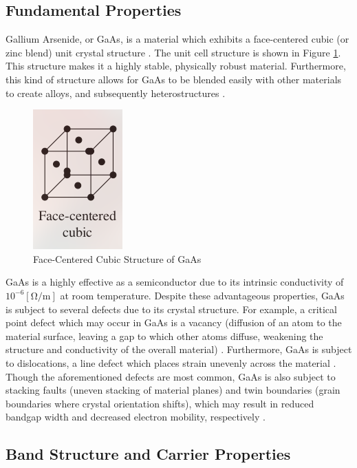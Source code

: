 \documentclass[conference]{IEEEtran}
\begin{document}
\subsection{Fundamental Properties}

Gallium Arsenide, or GaAs, is a material which exhibits a face-centered cubic (or zinc blend) unit crystal structure \cite[Page 104]{textbook}. The unit cell structure is shown in Figure \ref{fig:3}. This structure makes it a highly stable, physically robust material. Furthermore, this kind of structure allows for GaAs to be blended easily with other materials to create alloys, and subsequently heterostructures \cite[Page 568]{textbook}.

\begin{figure}[h]
  \centering
  \includegraphics[width=.2\textwidth]{Figures/FCC}
  \caption{Face-Centered Cubic Structure of GaAs \cite[Page 104]{textbook}}
  \label{fig:3}
\end{figure}

GaAs is a highly effective as a semiconductor due to its intrinsic conductivity of $10^{-6}[\si{\ohm\per\meter}]$ \cite[Page 167]{textbook} at room temperature. Despite these advantageous properties, GaAs is subject to several defects due to its crystal structure. For example, a critical point defect which may occur in GaAs is a vacancy (diffusion of an atom to the material surface, leaving a gap to which other atoms diffuse, weakening the structure and conductivity of the overall material) \cite[Page 71]{textbook}. Furthermore, GaAs is subject to dislocations, a line defect which places strain unevenly across the material \cite[Page 75]{textbook}. Though the aforementioned defects are most common, GaAs is also subject to stacking faults (uneven stacking of material planes) and twin boundaries (grain boundaries where crystal orientation shifts), which may result in reduced bandgap width and decreased electron mobility, respectively \cite{GaAsDOE}.

\subsection{Band Structure and Carrier Properties}
\end{document}
